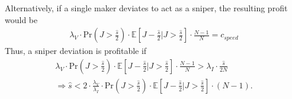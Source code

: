 \documentclass[12pt]{article}
\begin{document}
\begin{appendices}
Alternatively, if a single maker deviates to act as a sniper, the resulting profit would be
\begin{gather}
\lambda_V\cdot\textrm{Pr}\left(J>\frac{\hat{s}}{2}\right)\cdot\mathbb{E}\left[J-\frac{\hat{s}}{2}|J>\frac{\hat{s}}{2}\right]\cdot\frac{N-1}{N}=c_{speed} \label{sniperDeviation2}
\end{gather}
Thus, a sniper deviation is profitable if
\begin{gather}
\lambda_V\cdot \textrm{Pr}\left(J>\frac{\hat{s}}{2}\right)\cdot\mathbb{E}\left[J-\frac{\hat{s}}{2}|J>\frac{\hat{s}}{2}\right]\cdot\frac{N-1}{N} > \lambda_I\cdot\frac{\hat{s}}{2N} \label{sniperDeviation3} \\
\Rightarrow \hat{s} < 2 \cdot \frac{\lambda_V}{\lambda_I}\cdot\textrm{Pr}\left(J>\frac{\hat{s}}{2}\right)\cdot\mathbb{E}\left[J-\frac{\hat{s}}{2}|J>\frac{\hat{s}}{2}\right]\cdot(N-1). \label{deviation2}
\end{gather}


\end{appendices}
\end{document}
